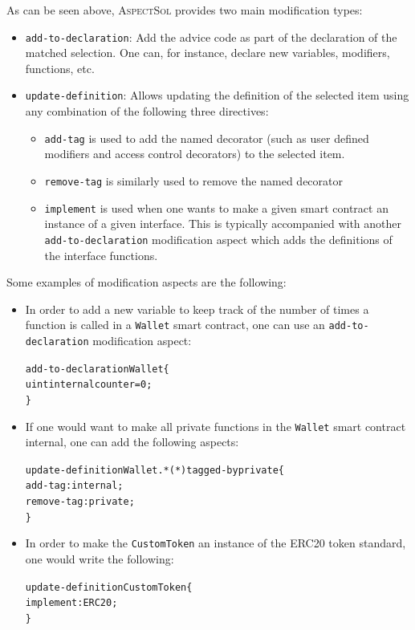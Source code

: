 \documentclass{article}
\newcommand{\AspectSol}{\textsc{AspectSol}\xspace}
\begin{document}
As can be seen above, \AspectSol provides two main modification types:

\begin{itemize}
	\item \texttt{add-to-declaration}: Add the advice code as part of the declaration of the matched selection. One can, for instance, declare new variables, modifiers, functions, etc. 
	\item \texttt{update-definition}: Allows updating the definition of the selected item using any combination of the following three directives:
	\begin{itemize}
		\item \texttt{add-tag} is used to add the named decorator (such as user defined modifiers and access control decorators) to the selected item.
		\item \texttt{remove-tag} is similarly used to remove the named decorator
		\item \texttt{implement} is used when one wants to make a given smart contract an instance of a given interface. This is typically accompanied with another \texttt{add-to-declaration} modification aspect which adds the definitions of the interface functions.  
	\end{itemize}
\end{itemize}

Some examples of modification aspects are the following:

\begin{itemize}
    \item In order to add a new variable to keep track of the number of times a function is called in a \texttt{Wallet} smart contract, one can use an \texttt{add-to-declaration} modification aspect:
    \begin{alltt}
add-to-declaration Wallet \{
    uint internal counter = 0;
\}
    \end{alltt}
    
    
    \item If one would want to make all private functions in the \texttt{Wallet} smart contract internal, one can add the following aspects:
    \begin{alltt}
update-definition Wallet.*(*) tagged-by private \{ 
   add-tag: internal; 
   remove-tag: private;
\}
    \end{alltt}
    
    \item In order to make the \texttt{CustomToken} an instance of the ERC20 token standard, one would write the following:
        \begin{alltt}
update-definition CustomToken \{
   implement: ERC20;
\}
    \end{alltt}

\end{itemize}
\end{document}
